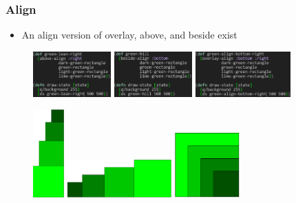 \documentclass{beamer}
\begin{document}
\begin{frame}
\frametitle{Align}
	\begin{itemize}
		\item An align version of overlay, above, and beside exist
	\end{itemize}
		\begin{figure}
		\includegraphics[width=3cm]{PresentationImages/greenLeanRightCode.png}
		\hspace{0.25cm}
		\includegraphics[width=3cm]{PresentationImages/greenSlopeBottomCode.png}
		\hspace{0.25cm}
		\includegraphics[width=3.65cm]{PresentationImages/greenAlignBottomRightCode.png}
	\end{figure}

	\begin{figure}
		\includegraphics[width=1.2cm]{PresentationImages/greenLeanRight.png}
		\hspace{1cm} 	\vspace{0.3cm}
		\includegraphics[width=4cm]{PresentationImages/greenSlopeBottom.png}
		\hspace{1cm} 	\vspace{0.3cm}
		\includegraphics[width=2.5cm]{PresentationImages/greenAlignBottomRight.png}
	\end{figure}

\end{frame}
\end{document}
